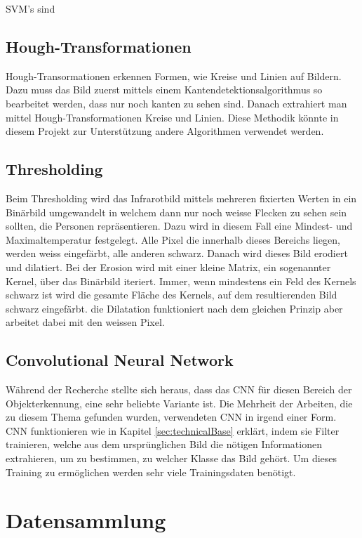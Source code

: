 \gls{SVM}'s sind 

\subsection{Hough-Transformationen}

Hough-Transormationen erkennen Formen, wie Kreise und Linien auf Bildern. Dazu muss das Bild zuerst mittels einem Kantendetektionsalgorithmus so bearbeitet werden, dass nur noch kanten zu sehen sind. Danach extrahiert man mittel Hough-Transformationen Kreise und Linien. Diese Methodik könnte in diesem Projekt zur Unterstützung andere Algorithmen verwendet werden.


\subsection{Thresholding}

Beim Thresholding wird das Infrarotbild mittels mehreren fixierten Werten in ein Binärbild umgewandelt in welchem dann nur noch weisse Flecken zu sehen sein sollten, die Personen repräsentieren. Dazu wird in diesem Fall eine Mindest- und Maximaltemperatur festgelegt. Alle Pixel die innerhalb dieses Bereichs liegen, werden weiss eingefärbt, alle anderen schwarz. Danach wird dieses Bild erodiert und dilatiert. Bei der Erosion wird mit einer kleine Matrix, ein sogenannter Kernel, über das Binärbild iteriert. Immer, wenn mindestens ein Feld des Kernels schwarz ist wird die gesamte Fläche des Kernels, auf dem resultierenden Bild schwarz eingefärbt. die Dilatation funktioniert nach dem gleichen Prinzip aber arbeitet dabei mit den weissen Pixel.

\subsection{Convolutional Neural Network}

Während der Recherche stellte sich heraus, dass das \gls{CNN} für diesen Bereich der Objekterkennung, eine sehr beliebte Variante ist. Die Mehrheit der Arbeiten, die zu diesem Thema gefunden wurden, verwendeten \gls{CNN} in irgend einer Form.\\
\gls{CNN} funktionieren wie in Kapitel \ref{sec:technicalBase} erklärt, indem sie Filter trainieren, welche aus dem ursprünglichen Bild die nötigen Informationen extrahieren, um zu bestimmen, zu welcher Klasse das Bild gehört. Um dieses Training zu ermöglichen werden sehr viele Trainingsdaten benötigt.

\section{Datensammlung}

